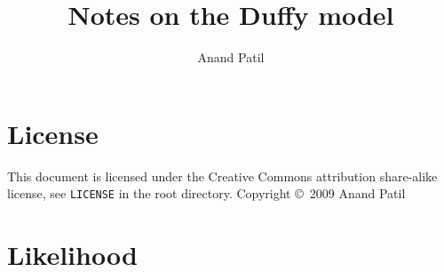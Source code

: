 \documentclass[a4paper]{article}
\begin{document}
\title{Notes on the Duffy model}
\author{Anand Patil}
\maketitle

\section{License} %
\label{sec:license}
This document is licensed under the Creative Commons attribution share-alike license, see \texttt{LICENSE} in the root directory. Copyright \copyright\ 2009 Anand Patil

\section{Likelihood} %
\label{sec:likelihood}
\end{document}
